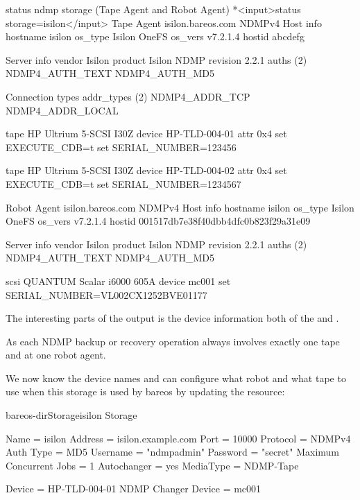 \begin{bconsole}{status ndmp storage (Tape Agent and Robot Agent)}
*<input>status storage=isilon</input>
Tape Agent isilon.bareos.com NDMPv4
  Host info
    hostname   isilon
    os_type    Isilon OneFS
    os_vers    v7.2.1.4
    hostid     abcdefg

  Server info
    vendor     Isilon
    product    Isilon NDMP
    revision   2.2.1
    auths      (2) NDMP4_AUTH_TEXT NDMP4_AUTH_MD5

  Connection types
    addr_types (2) NDMP4_ADDR_TCP NDMP4_ADDR_LOCAL

  tape HP Ultrium 5-SCSI I30Z
    device     HP-TLD-004-01
      attr       0x4
      set        EXECUTE_CDB=t
      set        SERIAL_NUMBER=123456

  tape HP Ultrium 5-SCSI I30Z
    device     HP-TLD-004-02
      attr       0x4
      set        EXECUTE_CDB=t
      set        SERIAL_NUMBER=1234567

Robot Agent isilon.bareos.com NDMPv4
  Host info
    hostname   isilon
    os_type    Isilon OneFS
    os_vers    v7.2.1.4
    hostid     001517db7e38f40dbb4dfc0b823f29a31e09

  Server info
    vendor     Isilon
    product    Isilon NDMP
    revision   2.2.1
    auths      (2) NDMP4_AUTH_TEXT NDMP4_AUTH_MD5

  scsi QUANTUM Scalar i6000 605A
    device     mc001
      set        SERIAL_NUMBER=VL002CX1252BVE01177
\end{bconsole}

The interesting parts of the output is the device information
both of the \TapeAgent and \RobotAgent.

As each NDMP backup or recovery operation always involves exactly one tape and at one robot agent.

We now know the device names and can configure what robot and what tape to use when this storage is used by bareos by updating the  resource:

\begin{bareosConfigResource}{bareos-dir}{Storage}{isilon}
Storage {
  Name = isilon
  Address = isilon.example.com
  Port = 10000
  Protocol = NDMPv4
  Auth Type = MD5
  Username = "ndmpadmin"
  Password = "secret"
  Maximum Concurrent Jobs = 1
  Autochanger = yes
  MediaType = NDMP-Tape

  Device = HP-TLD-004-01
  NDMP Changer Device = mc001
}
\end{bareosConfigResource}



